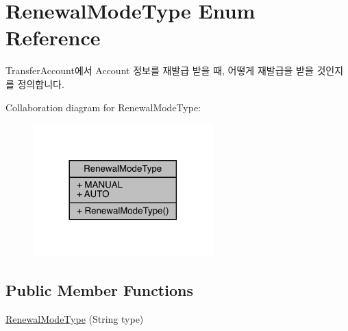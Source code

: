 \hypertarget{enumcom_1_1toast_1_1android_1_1gamebase_1_1auth_1_1transfer_1_1data_1_1_renewal_mode_type}{}\section{Renewal\+Mode\+Type Enum Reference}
\label{enumcom_1_1toast_1_1android_1_1gamebase_1_1auth_1_1transfer_1_1data_1_1_renewal_mode_type}


Transfer\+Account에서 Account 정보를 재발급 받을 때, 어떻게 재발급을 받을 것인지를 정의합니다.  




Collaboration diagram for Renewal\+Mode\+Type\+:
\nopagebreak
\begin{figure}[H]
\begin{center}
\leavevmode
\includegraphics[width=197pt]{enumcom_1_1toast_1_1android_1_1gamebase_1_1auth_1_1transfer_1_1data_1_1_renewal_mode_type__coll__graph}
\end{center}
\end{figure}
\subsection*{Public Member Functions}
\begin{DoxyCompactItemize}
\item 
\hyperlink{enumcom_1_1toast_1_1android_1_1gamebase_1_1auth_1_1transfer_1_1data_1_1_renewal_mode_type_a5d0ca60d3224b0b2d7b42029b34be823}{Renewal\+Mode\+Type} (String type)
\end{DoxyCompactItemize}
